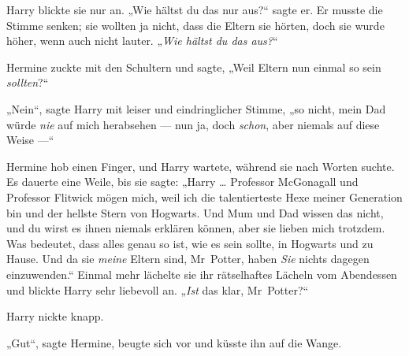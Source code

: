 Harry blickte sie nur an.
„Wie hältst du das nur aus?“ sagte er. Er musste die Stimme senken; sie wollten ja nicht, dass die Eltern sie hörten, doch sie wurde höher, wenn auch nicht lauter.
„\emph{Wie hältst du das aus?}“

Hermine zuckte mit den Schultern und sagte,
„Weil Eltern nun einmal so sein \emph{sollten}?“

„Nein“, sagte Harry mit leiser und eindringlicher Stimme, „so nicht, mein Dad würde \emph{nie} auf mich herabsehen — nun ja, doch \emph{schon}, aber niemals auf diese Weise —“

Hermine hob einen Finger, und Harry wartete, während sie nach Worten suchte. Es dauerte eine Weile, bis sie sagte: „Harry … Professor McGonagall und Professor Flitwick mögen mich, weil ich die talentierteste Hexe meiner Generation bin und der hellste Stern von Hogwarts. Und Mum und Dad wissen das nicht, und du wirst es ihnen niemals erklären können, aber sie lieben mich trotzdem. Was bedeutet, dass alles genau so ist, wie es sein sollte, in Hogwarts und zu Hause. Und da sie \emph{meine} Eltern sind, Mr~Potter, haben \emph{Sie} nichts dagegen einzuwenden.“ Einmal mehr lächelte sie ihr rätselhaftes Lächeln vom Abendessen und blickte Harry sehr liebevoll an. „\emph{Ist} das klar, Mr~Potter?“

Harry nickte knapp.

„Gut“, sagte Hermine, beugte sich vor und küsste ihn auf die Wange.

